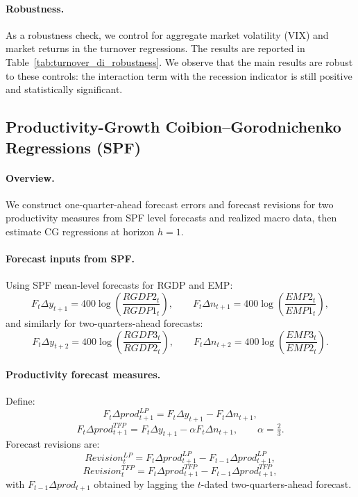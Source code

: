\paragraph{Robustness.} As a robustness check, we control for aggregate market volatility (VIX) and market returns in the turnover regressions. 
The results are reported in Table~\ref{tab:turnover_di_robustness}.
We observe that the main results are robust to these controls: the interaction term with the recession indicator is still positive and statistically significant.



\subsection{Productivity-Growth Coibion--Gorodnichenko Regressions (SPF)}\label{app:data_productivity_cg}

\paragraph{Overview.}
We construct one-quarter-ahead forecast errors and forecast revisions for two productivity measures from SPF level forecasts and realized macro data, then estimate CG regressions at horizon \(h=1\).

\paragraph{Forecast inputs from SPF.}
Using SPF mean-level forecasts for RGDP and EMP:
\[
F_t\Delta y_{t+1}=400\log\!\left(\frac{RGDP2_t}{RGDP1_t}\right),\qquad
F_t\Delta n_{t+1}=400\log\!\left(\frac{EMP2_t}{EMP1_t}\right),
\]
and similarly for two-quarters-ahead forecasts:
\[
F_t\Delta y_{t+2}=400\log\!\left(\frac{RGDP3_t}{RGDP2_t}\right),\qquad
F_t\Delta n_{t+2}=400\log\!\left(\frac{EMP3_t}{EMP2_t}\right).
\]

\paragraph{Productivity forecast measures.}
Define:
\[
F_t\Delta prod^{LP}_{t+1}=F_t\Delta y_{t+1}-F_t\Delta n_{t+1},
\]
\[
F_t\Delta prod^{TFP}_{t+1}=F_t\Delta y_{t+1}-\alpha F_t\Delta n_{t+1},\qquad \alpha=\tfrac{2}{3}.
\]
Forecast revisions are:
\[
Revision^{LP}_t = F_t\Delta prod^{LP}_{t+1} - F_{t-1}\Delta prod^{LP}_{t+1},
\]
\[
Revision^{TFP}_t = F_t\Delta prod^{TFP}_{t+1} - F_{t-1}\Delta prod^{TFP}_{t+1},
\]
with \(F_{t-1}\Delta prod_{t+1}\) obtained by lagging the \(t\)-dated two-quarters-ahead forecast.

